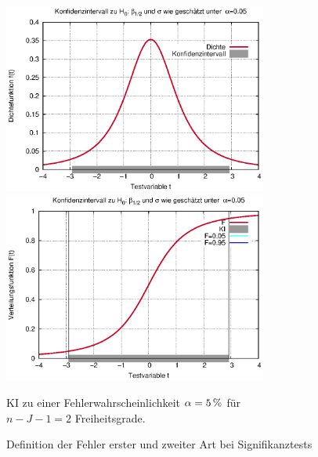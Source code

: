 \begin{landscape}
\begin{center}
\newpage

\newpage
\vspace{3em}

\parbox{1.31\textwidth}{
\includegraphics[width=0.65\textwidth]{figsRegr/f_student_KI.eps}
\includegraphics[width=0.65\textwidth]{figsRegr/F_student_KI.eps}
}
\vspace{2em}

\parbox{1.0\textwidth}{KI zu einer Fehlerwahrscheinlichkeit
  $\alpha=\unit[5]{\%}$ f\"ur\\ $n-J-1=2$ 
Freiheitsgrade.}

\newpage
\vspace{2em}

Definition der Fehler
erster und zweiter Art bei Signifikanztests


\end{center}
\end{landscape}
